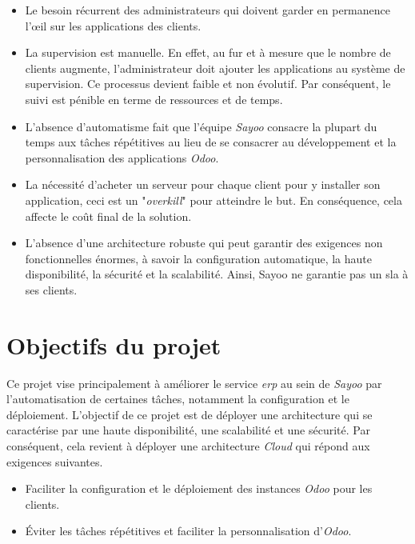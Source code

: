 \begin{onehalfspace}
\begin{itemize}
\item Le besoin récurrent des administrateurs qui doivent garder en permanence l'œil sur les applications des clients.

\item La supervision est manuelle. En effet, au fur et à mesure que le nombre de clients augmente, l'administrateur doit ajouter les applications au système de supervision. Ce processus devient faible et non évolutif. Par conséquent, le suivi est pénible en terme de ressources et de temps.

\item L'absence d'automatisme fait que l'équipe \emph{Sayoo} consacre la plupart du temps aux tâches répétitives au lieu de se consacrer au développement et la personnalisation des applications \emph{Odoo}. 

\item La nécessité d'acheter un serveur pour chaque client pour y installer son application, ceci est un "\emph{overkill}" pour atteindre le but. En conséquence, cela affecte le coût final de la solution.

\item L'absence d'une architecture robuste qui peut garantir des exigences non fonctionnelles énormes, à savoir la configuration automatique, la haute disponibilité, la sécurité et la scalabilité. Ainsi, Sayoo ne garantie pas un \acrshort{sla} à ses clients.

\end{itemize}




\section{Objectifs du projet}
Ce projet vise principalement à améliorer le service \emph{\acrshort{erp}} au sein de \emph{Sayoo} par l'automatisation de certaines tâches, notamment la configuration et le déploiement. L'objectif de ce projet est de déployer une architecture qui se caractérise par une haute disponibilité, une scalabilité et une sécurité. Par conséquent, cela revient à déployer une architecture \emph{Cloud} qui répond aux exigences suivantes.
\begin{itemize}

\item Faciliter la configuration et le déploiement des instances \emph{Odoo} pour les clients.

\item Éviter les tâches répétitives et faciliter la personnalisation d'\emph{Odoo}.


\end{itemize}
\end{onehalfspace}
